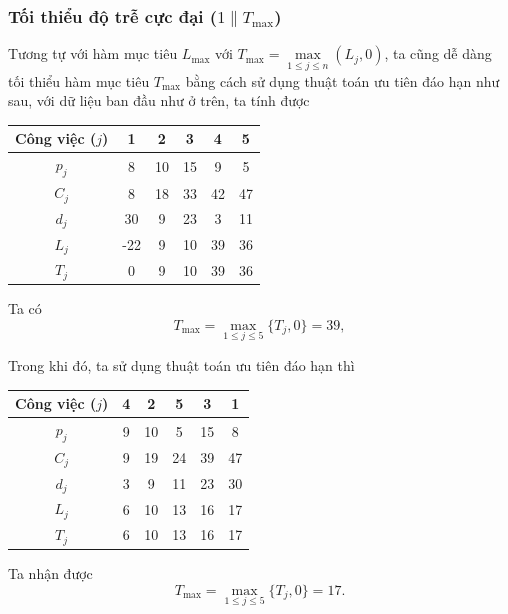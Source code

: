 \subsubsection*{Tối thiểu độ trễ cực đại ($1 \| T_{\max}$)}
Tương tự với hàm mục tiêu $L_{\max}$ với $T_{\max}=\underset{1 \leq j \leq n}{\max} (L_j,0)$, ta cũng dễ dàng tối thiểu hàm mục tiêu $T_{\max}$ bằng cách sử dụng thuật toán ưu tiên đáo hạn như sau, với dữ liệu ban đầu như ở trên, ta tính được

\begin{table}[h!]
	\centering
	\begin{tabular}{|c | c c c c c |} 
	\hline
	Công việc ($j$) & 1 & 2 & 3 & 4 & 5 \\
	\hline\hline
	$p_j$ & 8 & 10 & 15 & 9 & 5 \\
	$C_j$ & 8 & 18 & 33 & 42 & 47 \\
	$d_j$ & 30 & 9 & 23 & 3 & 11 \\
	$L_j$ & -22 & 9 & 10 & 39 & 36 \\
	$T_j$ & 0 & 9 & 10 & 39 & 36 \\
	\hline
	\end{tabular}
\end{table}
Ta có
\begin{equation*}
	T_{\max} = \max _{1 \leq j \leq 5} \{T_j, 0\} = 39,
\end{equation*}

Trong khi đó, ta sử dụng thuật toán ưu tiên đáo hạn thì

\begin{table}[h!]
	\centering
	\begin{tabular}{|c | c c c c c |} 
	\hline
	Công việc ($j$) & 4 & 2 & 5 & 3 & 1 \\
	\hline\hline
	$p_j$ & 9 & 10 & 5 & 15 & 8 \\
	$C_j$ & 9 & 19 & 24 & 39 & 47 \\
	$d_j$ & 3 & 9 & 11 & 23 & 30 \\
	$L_j$ & 6 & 10 & 13 & 16 & 17 \\
	$T_j$ & 6 & 10 & 13 & 16 & 17 \\
	\hline
	\end{tabular}
\end{table}

Ta nhận được
\begin{equation*}
	T_{\max} = \max _{1 \leq j \leq 5} \{T_j, 0\} = 17.
\end{equation*}


